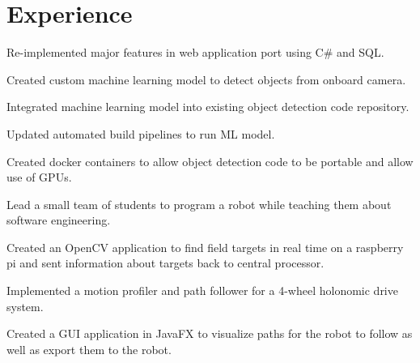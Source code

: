 \documentclass[]{deedy-resume-openfont}
\begin{document}

\section{Experience}
\hfill {}
\begin{tightemize}
    \item Re-implemented major features in web application port using C\# and SQL.
    \item Created custom machine learning model to detect objects from onboard camera.
    \item Integrated machine learning model into existing object detection code repository.
    \item Updated automated build pipelines to run ML model.
    \item Created docker containers to allow object detection code to be portable and allow use of GPUs.
\end{tightemize}
\sectionsep

\hfill {}
\begin{tightemize}
	\item Lead a small team of students to program a robot while teaching them about software engineering.
	\item Created an OpenCV application to find field targets in real time on a raspberry pi and sent information about targets back to central processor.
	\item Implemented a motion profiler and path follower for a 4-wheel holonomic drive system.
	\item Created a GUI application in JavaFX to visualize paths for the robot to follow as well as export them to the robot.
\end{tightemize}
\sectionsep
\end{document}
